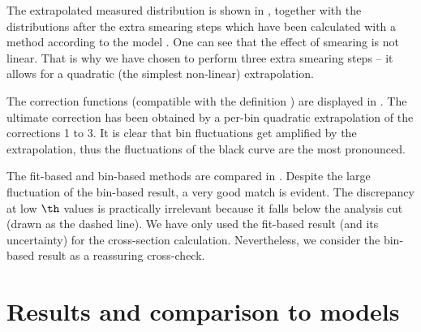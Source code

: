 The extrapolated measured distribution is shown in , together with the distributions after the extra smearing steps which have been calculated with a  method according to the model . One can see that the effect of smearing is not linear. That is why we have chosen to perform three extra smearing steps -- it allows for a quadratic (the simplest non-linear) extrapolation.

The correction functions (compatible with the definition ) are displayed in . The ultimate correction has been obtained by a per-bin quadratic extrapolation of the corrections 1 to 3. It is clear that bin fluctuations get amplified by the extrapolation, thus the fluctuations of the black curve are the most pronounced.

\bmfig
{}
\emfig

\vskip-3mm

The fit-based and bin-based methods are compared in . Despite the large fluctuation of the bin-based result, a very good match is evident. The discrepancy at low $\th$ values is practically irrelevant because it falls below the analysis cut (drawn as the dashed line). We have only used the fit-based result (and its uncertainty) for the cross-section calculation. Nevertheless, we consider the bin-based result as a reassuring cross-check.

\kern-5mm




\section[felm cmp]{Results and comparison to models}

